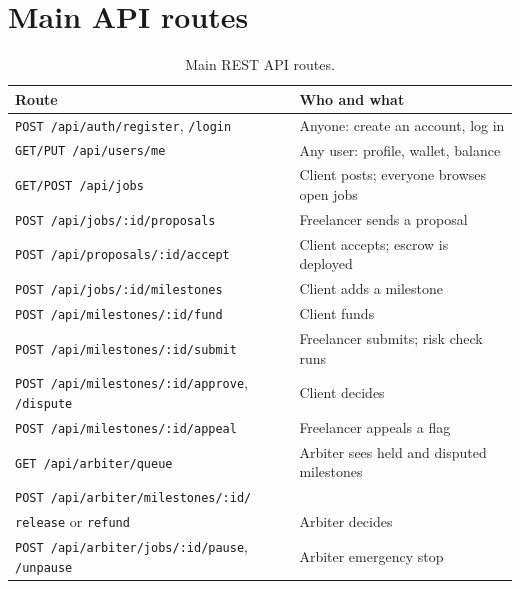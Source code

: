 \section{Main API routes}
\begin{table}[htbp]
\centering
\small
\begin{tabularx}{\textwidth}{>{\raggedright\arraybackslash}p{8.2cm}L}
\hline
\textbf{Route} & \textbf{Who and what} \\ \hline
\texttt{POST /api/auth/register}, \texttt{/login} & Anyone: create an account, log in \\
\texttt{GET/PUT /api/users/me} & Any user: profile, wallet, balance \\
\texttt{GET/POST /api/jobs} & Client posts; everyone browses open jobs \\
\texttt{POST /api/jobs/:id/proposals} & Freelancer sends a proposal \\
\texttt{POST /api/proposals/:id/accept} & Client accepts; escrow is deployed \\
\texttt{POST /api/jobs/:id/milestones} & Client adds a milestone \\
\texttt{POST /api/milestones/:id/fund} & Client funds \\
\texttt{POST /api/milestones/:id/submit} & Freelancer submits; risk check runs \\
\texttt{POST /api/milestones/:id/approve}, \texttt{/dispute} & Client decides \\
\texttt{POST /api/milestones/:id/appeal} & Freelancer appeals a flag \\
\texttt{GET /api/arbiter/queue} & Arbiter sees held and disputed milestones \\
\texttt{POST /api/arbiter/milestones/:id/}\\\texttt{release} or \texttt{refund} & Arbiter decides \\
\texttt{POST /api/arbiter/jobs/:id/pause}, \texttt{/unpause} & Arbiter emergency stop \\ \hline
\end{tabularx}
\caption{Main REST API routes.}
\label{tab:api}
\end{table}
